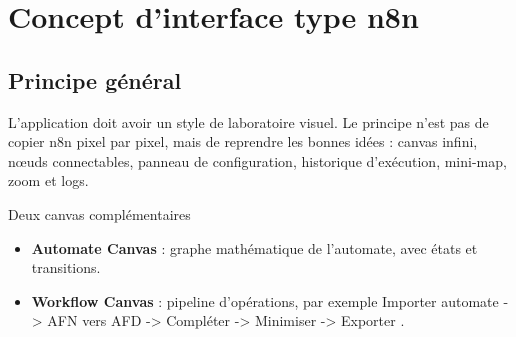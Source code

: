 \documentclass[11pt,a4paper]{report}
\begin{document}
\chapter{Concept d'interface type n8n}

\section{Principe général}
L'application doit avoir un style de laboratoire visuel. Le principe n'est pas de copier n8n pixel par pixel, mais de reprendre les bonnes idées : canvas infini, nœuds connectables, panneau de configuration, historique d'exécution, mini-map, zoom et logs.

\begin{uiblock}{Deux canvas complémentaires}
\begin{itemize}
  \item \textbf{Automate Canvas} : graphe mathématique de l'automate, avec états et transitions.
  \item \textbf{Workflow Canvas} : pipeline d'opérations, par exemple \og Importer automate -> AFN vers AFD -> Compléter -> Minimiser -> Exporter \fg{}.
\end{itemize}
\end{uiblock}
\end{document}

